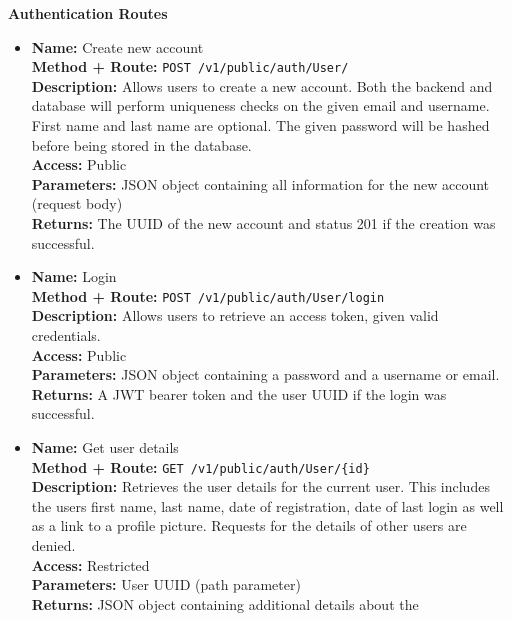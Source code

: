 \begin{itemize}
{    \textbf{Authentication Routes}
    \begin{itemize}
      \item {
        \textbf{Name:} Create new account\\
        \textbf{Method + Route:} \texttt{POST /v1/public/auth/User/}\\
        \textbf{Description:} Allows users to create a new account. Both the
        backend and database will perform uniqueness checks on the given email
        and username. First name and last name are optional. The given password
        will be hashed before being stored in the database.\\
        \textbf{Access:} Public\\
        \textbf{Parameters:} JSON object containing all information for the new
        account (request body)\\
        \textbf{Returns:} The UUID of the new account and status 201 if the
        creation was successful.\\
      }
      \item {
        \textbf{Name:} Login\\
        \textbf{Method + Route:} \texttt{POST /v1/public/auth/User/login}\\
        \textbf{Description:} Allows users to retrieve an access token, given
        valid credentials.\\
        \textbf{Access:} Public\\
        \textbf{Parameters:} JSON object containing a password and a username or
        email.\\
        \textbf{Returns:} A JWT bearer token and the user UUID if the login was
        successful.\\
      }
      \item {
        \textbf{Name:} Get user details\\
        \textbf{Method + Route:} \texttt{GET /v1/public/auth/User/\{id\}}\\
        \textbf{Description:} Retrieves the user details for the current user.
        This includes the users first name, last name, date of registration,
        date of last login as well as a link to a profile picture. Requests for
        the details of other users are denied.\\
        \textbf{Access:} Restricted\\
        \textbf{Parameters:} User UUID (path parameter)\\
        \textbf{Returns:} JSON object containing additional details about the
}
\end{itemize}}
\end{itemize}
